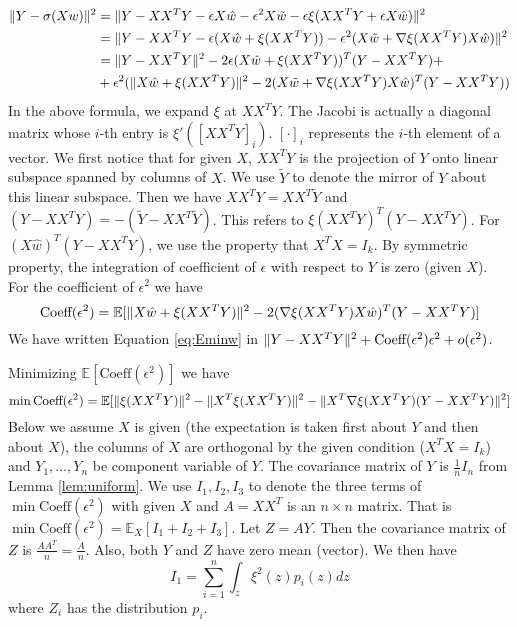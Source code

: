 \documentclass{article}
\DeclarePairedDelimiter\norm{\lVert}{\rVert}
\def\E{\mathbb{E}}
\begin{document}
\begin{align*}
\norm{Y - \sigma (X w ) }^2 & = \norm{Y - XX^T Y - \epsilon X \hat{w} - \epsilon^2 X \tilde{w} - \epsilon \xi(XX^T Y + \epsilon X\hat{w}) }^2 \\
& = \norm{ Y - XX^T Y - \epsilon (X\hat{w} + \xi(XX^T Y)) - \epsilon^2(X\tilde{w} + \nabla \xi(XX^TY)X\hat{w})}^2 \\
& = \norm{Y-XX^T Y }^2 - 2 \epsilon (X \hat{w} + \xi(XX^TY))^T (Y-XX^TY) +\\
& +\epsilon^2(\norm{X\hat{w} + \xi(XX^TY)}^2 - 2 (X \tilde{w}+ \nabla \xi(XX^TY)X\hat{w})^T(Y-XX^TY))
\end{align*}
In the above formula,  we expand $\xi$ at $XX^TY$. The Jacobi is actually a diagonal matrix whose $i$-th entry is $\xi'([XX^TY]_i)$. $[\cdot]_i$ represents the $i$-th element of a vector.
We first notice that for given $X$, $XX^TY$ is the projection of $Y$ onto linear subspace spanned by columns of $X$. We use $\tilde{Y}$ to denote the mirror of $Y$ about this linear subspace. Then we have
$XX^T Y = XX^T \tilde{Y}$ and $(Y- XX^TY) = -(\tilde{Y} - XX^T \tilde{Y})$. This refers to $\xi(XX^TY)^T (Y-XX^TY)$. For $(X\hat{w})^T (Y-XX^T Y)$, we use the property that $X^T X = I_k$.
By symmetric property, the integration of coefficient of $\epsilon$ with respect to $Y$ is zero (given $X$). 
 For the coefficient of $\epsilon^2$ we have
\begin{equation*}
\textrm{Coeff}(\epsilon^2)  =  \E[\norm{X\hat{w} + \xi(XX^TY)}^2 - 2 (\nabla \xi(XX^TY)X\hat{w})^T(Y-XX^TY)]
\end{equation*}
We have written Equation \eqref{eq:Eminw} in $ \norm{Y - X X^T Y}^2 + \textrm{Coeff}(\epsilon^2) \epsilon^2 + o(\epsilon^2)$.

Minimizing $\E[\textrm{Coeff}(\epsilon^2)]$ we have
\begin{equation}
\min \textrm{Coeff}(\epsilon^2) = \E[\norm{\xi(XX^TY)}^2 - \norm{X^T\xi(XX^TY)}^2 - \norm{X^T \nabla\xi(XX^TY)(Y-XX^TY)}^2]
\end{equation}
Below we assume $X$ is given (the expectation is taken first about $Y$ and then about $X$), the columns of $X$ are orthogonal by the given condition ($X^TX=I_k$) and $Y_1, \dots, Y_n $ be component variable of $Y$. The covariance matrix of $Y$ is $\frac{1}{n}I_n$ from Lemma \ref{lem:uniform}. We use $I_1, I_2, I_3$ to denote the three terms of $\min \textrm{Coeff}(\epsilon^2)$ with given $X$ and $A=XX^T$ is an $n\times n$ matrix. That is $ \min \textrm{Coeff}(\epsilon^2) = \E_{X} [I_1 + I_2 + I_3]$.
Let $Z = AY$. Then the covariance matrix of $Z$ is $\frac{AA^T}{n} = \frac{A}{n}$.
Also, both $Y$ and $Z$ have zero mean (vector). We then have
\begin{equation*}
I_1 = \sum_{i=1}^n \int_z \xi^2(z) p_i(z) dz
\end{equation*}
where $Z_i$ has the distribution $p_i$.
 
\end{document}
